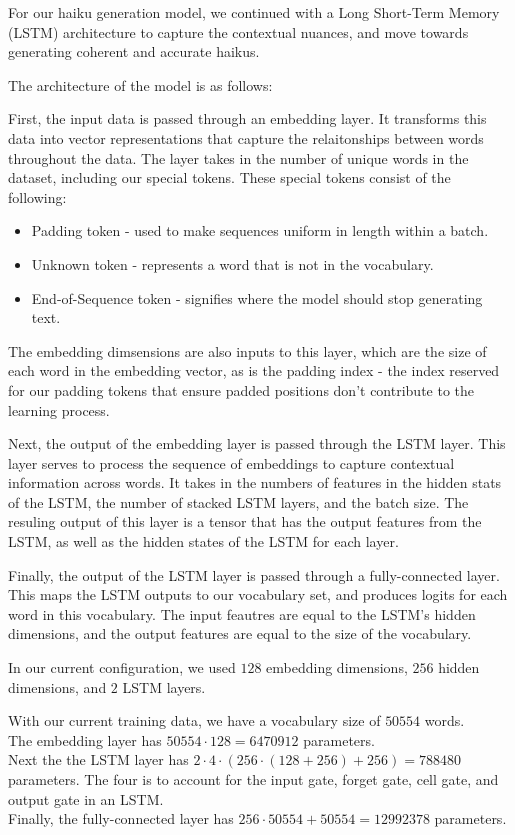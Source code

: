 \documentclass{article} %
\begin{document}
For our haiku generation model, we continued with a Long Short-Term Memory (LSTM) architecture to capture the contextual nuances, and move towards generating coherent and accurate haikus.

The architecture of the model is as follows:

First, the input data is passed through an embedding layer. 
It transforms this data into vector representations that capture the 
relaitonships between words throughout the data. 
The layer takes in the number of unique words in the dataset, 
including our special tokens. 
These special tokens consist of the following:
\begin{itemize}
  \item Padding token - used to make sequences uniform in length within a batch.
  \item Unknown token - represents a word that is not in the vocabulary.
  \item End-of-Sequence token - signifies where the model should stop generating text.
\end{itemize}

The embedding dimsensions are also inputs to this layer, which are the size
of each word in the embedding vector, as is the padding index - the index reserved
for our padding tokens that ensure padded positions don't contribute to the learning process.

Next, the output of the embedding layer is passed through the LSTM layer.
This layer serves to process the sequence of embeddings to capture
contextual information across words.
It takes in the numbers of features in the hidden stats of the LSTM, the number of stacked
LSTM layers, and the batch size.
The resuling output of this layer is a tensor that has the output features from the LSTM,
as well as the hidden states of the LSTM for each layer.

Finally, the output of the LSTM layer is passed through a fully-connected layer.
This maps the LSTM outputs to our vocabulary set, and produces logits for each word in this vocabulary.
The input feautres are equal to the LSTM's hidden dimensions, and the output features are equal to the size of the vocabulary.

In our current configuration, we used $128$ embedding dimensions, $256$ hidden dimensions, and $2$ LSTM layers.

With our current training data, we have a vocabulary size of $50554$ words. \\
The embedding layer has $50554 \cdot 128 = 6470912$ parameters. \\
Next the the LSTM layer has $2 \cdot 4 \cdot (256 \cdot (128 + 256) + 256) = 788480$ parameters. The four is to account for the input gate, forget gate, cell gate, and output gate in an LSTM. \\
Finally, the fully-connected layer has $256 \cdot 50554 + 50554 = 12992378$ parameters. \\
\end{document}
